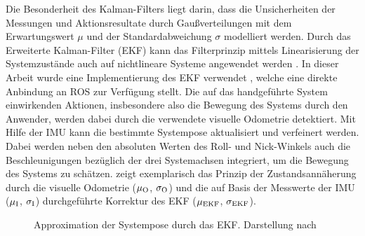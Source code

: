 Die Besonderheit des Kalman-Filters liegt darin, dass die Unsicherheiten der Messungen und Aktionsresultate durch Gaußverteilungen mit dem Erwartungswert $\mu$ und der Standardabweichung $\sigma$ modelliert werden. Durch das Erweiterte Kalman-Filter (EKF) kann das Filterprinzip mittels Linearisierung der Systemzustände auch auf nichtlineare Systeme angewendet werden \cite{Hertzberg2012}. In dieser Arbeit wurde eine Implementierung des EKF verwendet \cite{EKF}, welche eine direkte Anbindung an ROS zur Verfügung stellt. Die auf das handgeführte System einwirkenden Aktionen, insbesondere also die Bewegung des Systems durch den Anwender, werden dabei durch die verwendete visuelle Odometrie detektiert. Mit Hilfe der IMU kann die bestimmte Systempose aktualisiert und verfeinert werden. Dabei werden neben den absoluten Werten des Roll- und Nick-Winkels auch die Beschleunigungen bezüglich der drei Systemachsen integriert, um die Bewegung des Systems zu schätzen.  zeigt exemplarisch das Prinzip der Zustandsannäherung durch die visuelle Odometrie ($\mu_{{\mathrm{O}}}$, $\sigma_{{\mathrm{O}}}$) und die auf Basis der Messwerte der IMU ($\mu_{{\mathrm{I}}}$, $\sigma_{{\mathrm{I}}}$) durchgeführte Korrektur des EKF ($\mu_{{\mathrm{EKF}}}$, $\sigma_{{\mathrm{EKF}}}$).
\prever{
}%
\prever{
}
\begin{figure}[ht]
	\begin{center}%
		\hspace{5mm}
		\caption{Approximation der Systempose durch das EKF. Darstellung nach \cite{Hertzberg2012}}
		\label{fig.kalman}
	\end{center}
	\vspace*{-8mm}
\end{figure}

\prever{
}



